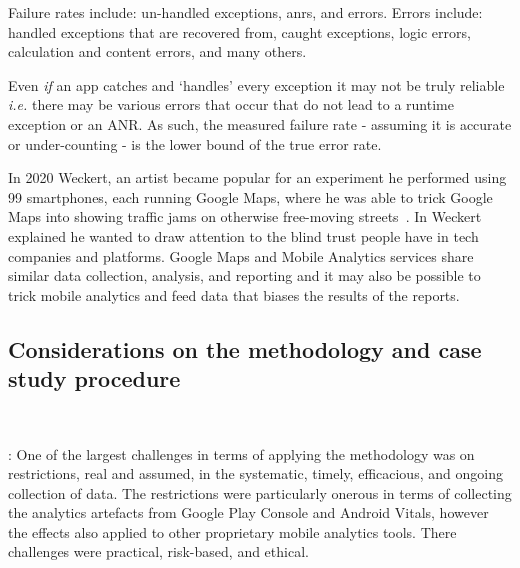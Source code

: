 Failure rates include: un-handled exceptions, \Glspl{anr}, and errors. Errors include: handled exceptions that are recovered from, caught exceptions, logic errors, calculation and content errors, and many others. 

Even \emph{if} an app catches and `handles' every exception it may not be truly reliable \emph{i.e.} there may be various errors that occur that do not lead to a runtime exception or an ANR. As such, the measured failure rate - assuming it is accurate or under-counting - is the lower bound of the true error rate.

In 2020 Weckert, an artist became popular for an experiment he performed using 99 smartphones, each running Google Maps, where he was able to trick Google Maps into showing traffic jams on otherwise free-moving streets~. In  Weckert explained he wanted to draw attention to the blind trust people have in tech companies and platforms. Google Maps and Mobile Analytics services share similar data collection, analysis, and reporting and it may also be possible to trick mobile analytics and feed data that biases the results of the reports.


\subsection{Considerations on the methodology and case study procedure}~\label{discussion-on-methodology-and-case-study-procedure}


: 
One of the largest challenges in terms of applying the methodology was on restrictions, real and assumed, in the systematic, timely, efficacious, and ongoing collection of data. The restrictions were particularly onerous in terms of collecting the analytics artefacts from Google Play Console and Android Vitals, however the effects also applied to other proprietary mobile analytics tools. There challenges were practical, risk-based, and ethical. 

